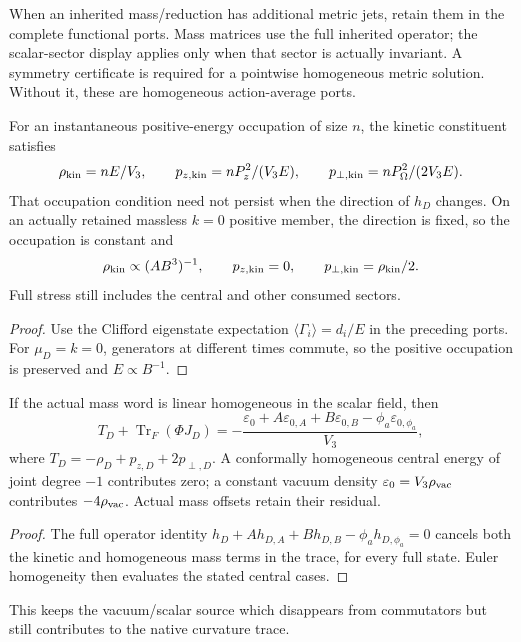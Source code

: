 \documentclass[12pt,a4paper]{article}
\begin{document}
When an inherited mass/reduction has additional metric jets, retain them in
the complete functional ports. Mass matrices use the full inherited operator;
the scalar-sector display applies only when that sector is actually invariant.
A symmetry certificate is required for a pointwise homogeneous metric
solution. Without it, these are homogeneous action-average ports.

\begin{corollary}
\label{p4:cor:spherical-free-positive-constituent}
For an instantaneous positive-energy occupation of size \(n\), the kinetic
constituent satisfies
\[
 \rho_{\rm kin}=nE/V_3,\qquad
 p_{z,\rm kin}=nP_z^2/(V_3E),\qquad
 p_{\perp,\rm kin}=nP_\Omega^2/(2V_3E).
\]
That occupation condition need not persist when the direction of \(h_D\)
changes. On an actually retained massless \(k=0\) positive member, the
direction is fixed, so the occupation is constant and
\[
 \rho_{\rm kin}\propto(AB^3)^{-1},\qquad p_{z,\rm kin}=0,
 \qquad p_{\perp,\rm kin}=\rho_{\rm kin}/2.
\]
Full stress still includes the central and other consumed sectors.
\end{corollary}
\begin{proof}
Use the Clifford eigenstate expectation \(\langle\Gamma_i\rangle=d_i/E\)
in the preceding ports. For \(\mu_D=k=0\), generators at different times
commute, so the positive occupation is preserved and \(E\propto B^{-1}\).
\end{proof}

\begin{corollary}
\label{p4:cor:spherical-dirac-trace-source-work}
If the actual mass word is linear homogeneous in the scalar field, then
\begin{equation}
 \boxed{T_D+\operatorname{Tr}_F(\Phi J_D)
 =-\frac{\varepsilon_0+A\varepsilon_{0,A}+B\varepsilon_{0,B}
 -\phi_a\varepsilon_{0,\phi_a}}{V_3},}
 \label{p4:eq:spherical-dirac-trace-source-work}
\end{equation}
where \(T_D=-\rho_D+p_{z,D}+2p_{\perp,D}\).
A conformally homogeneous central energy of joint degree \(-1\) contributes
zero; a constant vacuum density \(\varepsilon_0=V_3\rho_{\rm vac}\)
contributes \(-4\rho_{\rm vac}\). Actual mass offsets retain their residual.
\end{corollary}
\begin{proof}
The full operator identity
\(h_D+A h_{D,A}+B h_{D,B}-\phi_a h_{D,\phi_a}=0\)
cancels both the kinetic and homogeneous mass terms in the trace, for every
full state. Euler homogeneity then evaluates the stated central cases.
\end{proof}
This keeps the vacuum/scalar source which disappears from commutators but
still contributes to the native curvature trace.
\end{document}
